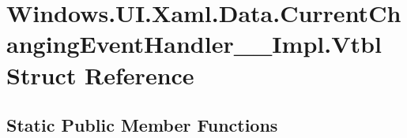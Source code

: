 \hypertarget{struct_windows_1_1_u_i_1_1_xaml_1_1_data_1_1_current_changing_event_handler_____impl_1_1_vtbl}{}\section{Windows.\+U\+I.\+Xaml.\+Data.\+Current\+Changing\+Event\+Handler\+\_\+\+\_\+\+Impl.\+Vtbl Struct Reference}
\label{struct_windows_1_1_u_i_1_1_xaml_1_1_data_1_1_current_changing_event_handler_____impl_1_1_vtbl}
\subsection*{Static Public Member Functions}
